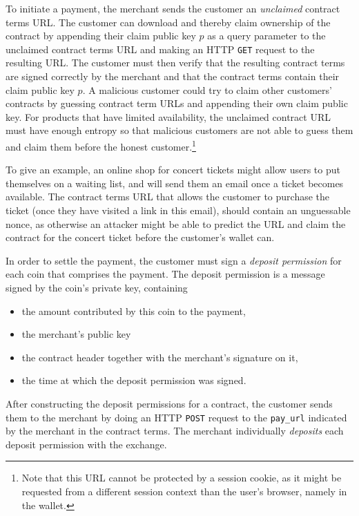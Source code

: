 To initiate a payment, the merchant sends the customer an \emph{unclaimed}
contract terms URL.  The customer can download and thereby claim ownership of
the contract by appending their claim public key $p$ as a query parameter to the unclaimed
contract terms URL and making an HTTP \texttt{GET} request to the resulting URL.
The customer must then verify that the resulting contract terms are signed
correctly by the merchant and that the contract terms contain their claim public key $p$.
A malicious customer could try to claim other customers' contracts by guessing
contract term URLs and appending their own claim public key.  For products that have
limited availability, the unclaimed contract URL must have enough entropy so
that malicious customers are not able to guess them and claim them before the
honest customer.\footnote{Note that this URL cannot be protected by a session
cookie, as it might be requested from a different session context than the
user's browser, namely in the wallet.}

To give an example, an online shop for concert tickets might allow users to put
themselves on a waiting list, and will send them an email once a ticket
becomes available.  The contract terms URL that allows the customer to purchase
the ticket (once they have visited a link in this email), should contain an
unguessable nonce, as otherwise an attacker might be able to predict the URL
and claim the contract for the concert ticket before the customer's wallet can.

In order to settle the payment, the customer must sign a \emph{deposit
permission} for each coin that comprises the payment.  The deposit permission
is a message signed by the coin's private key, containing
\begin{itemize}
  \item the amount contributed by this coin to the payment,
  \item the merchant's public key
  \item the contract header together with the merchant's signature on it,
  \item the time at which the deposit permission was signed.
\end{itemize}

After constructing the deposit permissions for a contract, the customer sends
them to the merchant by doing an HTTP \texttt{POST} request to the
\texttt{pay\_url} indicated by the merchant in the contract terms.  The
merchant individually \emph{deposits} each deposit permission with the
exchange.

